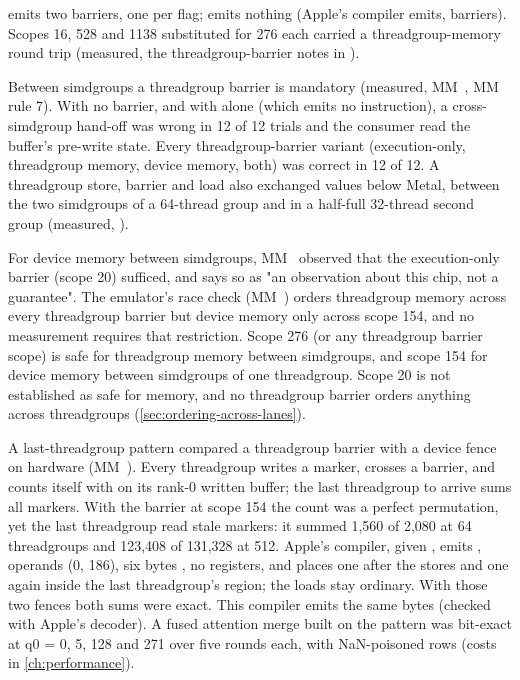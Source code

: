  emits two barriers, one per flag;  emits nothing
(Apple's compiler emits,  barriers). Scopes 16, 528 and 1138 substituted for 276 each
carried a threadgroup-memory round trip (measured, the threadgroup-barrier notes in ).

Between simdgroups a threadgroup barrier is mandatory (measured, MM~, MM~ rule 7). With no barrier, and with
 alone (which emits no instruction), a cross-simdgroup hand-off was wrong in 12 of 12 trials and
the consumer read the buffer's pre-write state. Every threadgroup-barrier variant
(execution-only, threadgroup memory, device memory, both) was correct in 12 of 12. A threadgroup store, barrier and load
also exchanged values below Metal, between the two simdgroups of a 64-thread group and in a half-full 32-thread second
group (measured, ).

For device memory between simdgroups, MM~ observed that the execution-only barrier (scope 20) sufficed, and says so as "an observation about this chip, not a guarantee". The
emulator's race check (MM~) orders threadgroup memory across every threadgroup barrier but device memory only across scope 154,
and no measurement requires that restriction. Scope 276 (or any threadgroup barrier scope) is safe for threadgroup
memory between simdgroups, and scope 154 for device memory between simdgroups of one threadgroup. Scope 20 is not
established as safe for memory, and no threadgroup barrier orders anything across threadgroups (\cref{sec:ordering-across-lanes}).

A last-threadgroup pattern compared a threadgroup barrier with a device fence on hardware (MM~). Every threadgroup
writes a marker, crosses a barrier, and counts itself with  on its rank-0
written buffer; the last threadgroup to arrive sums all markers. With the barrier at scope 154 the count was a perfect
permutation, yet the last threadgroup read stale markers: it summed 1,560 of 2,080 at 64 threadgroups and 123,408 of
131,328 at 512. Apple's compiler, given
, emits , operands (0, 186), six
bytes , no registers, and places one after the stores and one again inside the last threadgroup's region;
the loads stay ordinary. With those two fences both sums were exact. This compiler emits the same bytes (checked with
Apple's decoder). A fused attention merge built on the pattern was bit-exact at q0 = 0, 5, 128 and 271 over five
rounds each, with NaN-poisoned rows (costs in \cref{ch:performance}).


